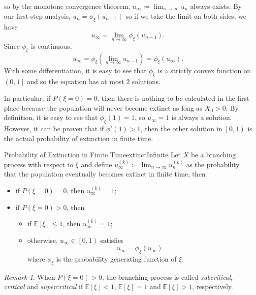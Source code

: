 \documentclass[math, code]{amznotes}
\theoremstyle{remark}
\newtheorem*{remark}{Remark}
\begin{document}
so by the monotone convergence theorem, $u_{\infty} \coloneqq \lim_{n \to \infty}u_n$ always exists. By our first-step analysis, $u_n = \phi_{\xi}\left(u_{n - 1}\right)$ so if we take the limit on both sides, we have 
\begin{equation*}
    u_{\infty} = \lim_{n \to \infty}\phi_{\xi}\left(u_{n - 1}\right).
\end{equation*}
Since $\phi_{\xi}$ is continuous, 
\begin{equation*}
    u_{\infty} = \phi_{\xi}\left(\lim_{n \to \infty}u_{n - 1}\right) = \phi_{\xi}\left(u_{\infty}\right).
\end{equation*}
With some differentiation, it is easy to see that $\phi_{\xi}$ is a strictly convex function on $\left(0, 1\right]$ and so the equation has at most $2$ solutions.

In particular, if $P\left(\xi = 0\right) = 0$, then there is nothing to be calculated in the first place because the population will never become extinct as long as $X_0 > 0$. By definition, it is easy to see that $\phi_{\xi}\left(1\right) = 1$, so $u_{\infty} = 1$ is always a solution. However, it can be proven that if $\phi'\left(1\right) > 1$, then the other solution in $\left[0, 1\right)$ is the actual probability of extinction in finite time.
\begin{probox}{Probability of Extinction in Finite Time}{extinctInfinite}
    Let $X$ be a branching process with respect to $\xi$ and define $u_{\infty}^{(k)} \coloneqq \lim_{n \to \infty}u_n^{(k)}$ as the probability that the population eventually becomes extinct in finite time, then 
    \begin{itemize}
        \item if $P\left(\xi = 0\right) = 0$, then $u_{\infty}^{(k)} = 1$;
        \item if $P\left(\xi = 0\right) > 0$, then 
        \begin{itemize}
            \item if $\mathbb{E}\left[\xi\right] \leq 1$, then $u_{\infty}^{(k)} = 1$;
            \item otherwise, $u_{\infty} \in \left[0, 1\right)$ satisfies
            \begin{equation*}
                u_{\infty} = \phi_{\xi}\left(u_{\infty}\right)
            \end{equation*}
            where $\phi_{\xi}$ is the probability generating function of $\xi$.
        \end{itemize}
    \end{itemize}
\end{probox}
\begin{notebox}
    \begin{remark}
        When $P\left(\xi = 0\right) > 0$, the branching process is called \textit{subcritical}, \textit{critical} and \textit{supercritical} if $\mathbb{E}\left[\xi\right] < 1$, $\mathbb{E}\left[\xi\right] = 1$ and $\mathbb{E}\left[\xi\right] > 1$, respectively.
    \end{remark}
\end{notebox}
\end{document}
